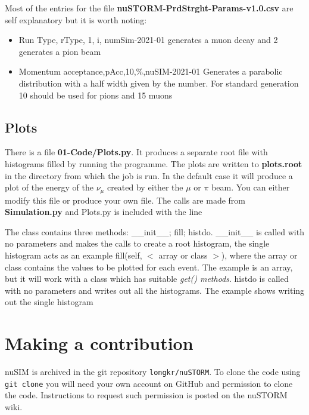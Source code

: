 \hfil\newline
\noindent Most of the entries for the file {\bf nuSTORM-PrdStrght-Params-v1.0.csv} are self explanatory but it is worth noting:
\begin{itemize}
\item Run Type, rType, 1, i, numSim-2021-01 generates a muon decay and 2 generates a pion beam\newline
\item Momentum acceptance,pAcc,10,\%,nuSIM-2021-01\newline
Generates a parabolic distribution with a half width given by the number. For standard generation 10 should be used for pions and 15 muons
\end{itemize}

  
 \subsection{Plots}
 There is a file {\bf 01-Code/Plots.py}. It produces a separate root file with histograms filled by running the programme. The
 plots are written to {\bf plots.root} in the directory from which the job is run. In the default case it will produce a plot
 of the energy of the $\nu_{\mu}$ created by either the $\mu$ or $\pi$ beam. You can either modify this file or produce your own file. The calls are made from {\bf Simulation.py} and Plots.py is included with the line 
 \hfill\newline
 
 \noindent The class contains three methods: \_\_init\_\_; fill; histdo.\newline
 \_\_init\_\_ is called with no parameters and makes the calls to create a root histogram, the single histogram acts as
 an example\newline
fill(self, $<$ array or class $>$), where the array or class contains the values to be plotted for each event. The example is an array, but it will work  with a class which has suitable {\it get() methods}.\newline
histdo is called with no parameters and writes out all the histograms. The example shows writing out the single histogram
 
 
\section*{Making a contribution}
nuSIM is archived in the git repository \verb+longkr/nuSTORM+.
To clone the code using
\verb+git clone+ you will need your own account on GitHub and
permission to clone the code. 
Instructions to request such permission is posted on the nuSTORM
wiki.
